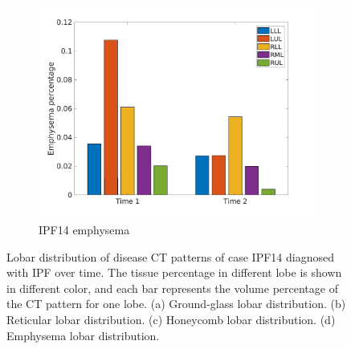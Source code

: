 \begin{figure}[H]
\begin{subfigure}{.46\linewidth}
  \includegraphics[width=\linewidth,trim={{.0\wd0} {.0\wd0} {.0\wd0} {.0\wd0}},clip]{Appendix/Image_AppexA/LobarDistribution/IPF14EmphysemaLobarRegionDiseaseDistributionOverTime.jpg}
  \caption{IPF14 emphysema}
  \label{fig:IPF14LobarRegionDiseaseDistributionOverTime-d}
\end{subfigure}
\caption{Lobar distribution of disease CT patterns of case IPF14 diagnosed with IPF over time. The tissue percentage in different lobe is shown in different color, and each bar represents the volume percentage of the CT pattern for one lobe. (a) Ground-glass lobar distribution. (b) Reticular lobar distribution. (c) Honeycomb lobar distribution. (d) Emphysema lobar distribution.}
\label{fig:IPF14LobarRegionDiseaseDistributionOverTime}
\end{figure}


